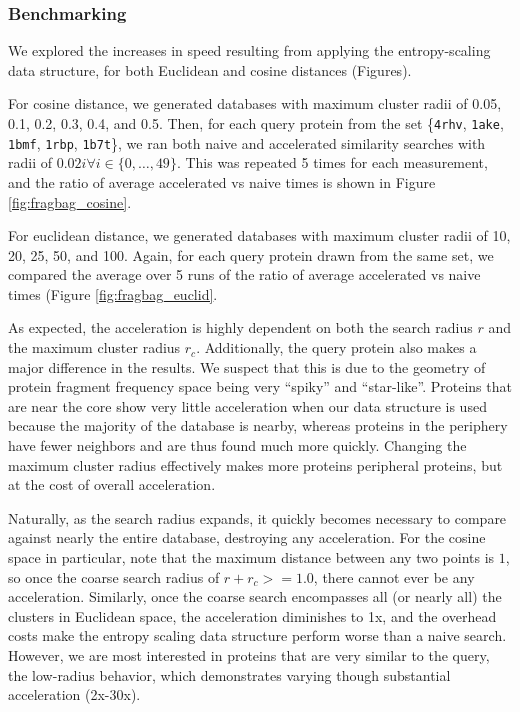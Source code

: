 \documentclass[review,preprint,12pt]{elsarticle}
\theoremstyle{definition}
\theoremstyle{remark}
\numberwithin{equation}{section}
\begin{document}
\subsubsection{Benchmarking}
We explored the increases in speed resulting from applying the entropy-scaling data structure, for both Euclidean and cosine distances (Figures).

For cosine distance, we generated databases with maximum cluster radii of 0.05, 0.1, 0.2, 0.3, 0.4, and 0.5.
Then, for each query protein from the set \{\texttt{4rhv}, \texttt{1ake}, \texttt{1bmf}, \texttt{1rbp}, \texttt{1b7t}\}, we ran both naive and accelerated similarity searches with radii of $0.02i \forall i \in \{0,\ldots,49\}$.
This was repeated 5 times for each measurement, and the ratio of average accelerated vs naive times is shown in Figure \ref{fig:fragbag_cosine}.

For euclidean distance, we generated databases with maximum cluster radii of 10, 20, 25, 50, and 100.
Again, for each query protein drawn from the same set, we compared the average over 5 runs of the ratio of average accelerated vs naive times (Figure \ref{fig:fragbag_euclid}.

As expected, the acceleration is highly dependent on both the search radius $r$ and the maximum cluster radius $r_c$.
Additionally, the query protein also makes a major difference in the results.
We suspect that this is due to the geometry of protein fragment frequency space being very ``spiky'' and ``star-like''.
Proteins that are near the core show very little acceleration when our data structure is used because the majority of the database is nearby, whereas proteins in the periphery have fewer neighbors and are thus found much more quickly.
Changing the maximum cluster radius effectively makes more proteins peripheral proteins, but at the cost of overall acceleration.

Naturally, as the search radius expands, it quickly becomes necessary to compare against nearly the entire database, destroying any acceleration.
For the cosine space in particular, note that the maximum distance between any two points is $1$, so once the coarse search radius of $r+r_c >= 1.0$, there cannot ever be any acceleration.
Similarly, once the coarse search encompasses all (or nearly all) the clusters in Euclidean space, the acceleration diminishes to 1x, and the overhead costs make the entropy scaling data structure perform worse than a naive search.
However, we are most interested in proteins that are very similar to the query, the low-radius behavior, which demonstrates varying though substantial acceleration (2x-30x).
\end{document}
